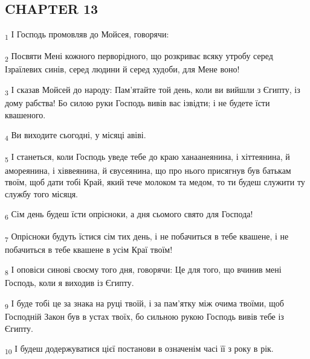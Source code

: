 \subsection{CHAPTER 13}
\begin{tcolorbox}
\textsubscript{1} І Господь промовляв до Мойсея, говорячи:
\end{tcolorbox}
\begin{tcolorbox}
\textsubscript{2} Посвяти Мені кожного перворідного, що розкриває всяку утробу серед Ізраїлевих синів, серед людини й серед худоби, для Мене воно!
\end{tcolorbox}
\begin{tcolorbox}
\textsubscript{3} І сказав Мойсей до народу: Пам'ятайте той день, коли ви вийшли з Єгипту, із дому рабства! Бо силою руки Господь вивів вас ізвідти; і не будете їсти квашеного.
\end{tcolorbox}
\begin{tcolorbox}
\textsubscript{4} Ви виходите сьогодні, у місяці авіві.
\end{tcolorbox}
\begin{tcolorbox}
\textsubscript{5} І станеться, коли Господь уведе тебе до краю ханаанеянина, і хіттеянина, й амореянина, і хіввеянина, й євусеянина, що про нього присягнув був батькам твоїм, щоб дати тобі Край, який тече молоком та медом, то ти будеш служити ту службу того місяця.
\end{tcolorbox}
\begin{tcolorbox}
\textsubscript{6} Сім день будеш їсти опрісноки, а дня сьомого свято для Господа!
\end{tcolorbox}
\begin{tcolorbox}
\textsubscript{7} Опрісноки будуть їстися сім тих день, і не побачиться в тебе квашене, і не побачиться в тебе квашене в усім Краї твоїм!
\end{tcolorbox}
\begin{tcolorbox}
\textsubscript{8} І оповіси синові своєму того дня, говорячи: Це для того, що вчинив мені Господь, коли я виходив із Єгипту.
\end{tcolorbox}
\begin{tcolorbox}
\textsubscript{9} І буде тобі це за знака на руці твоїй, і за пам'ятку між очима твоїми, щоб Господній Закон був в устах твоїх, бо сильною рукою Господь вивів тебе із Єгипту.
\end{tcolorbox}
\begin{tcolorbox}
\textsubscript{10} І будеш додержуватися цієї постанови в означенім часі її з року в рік.
\end{tcolorbox}
